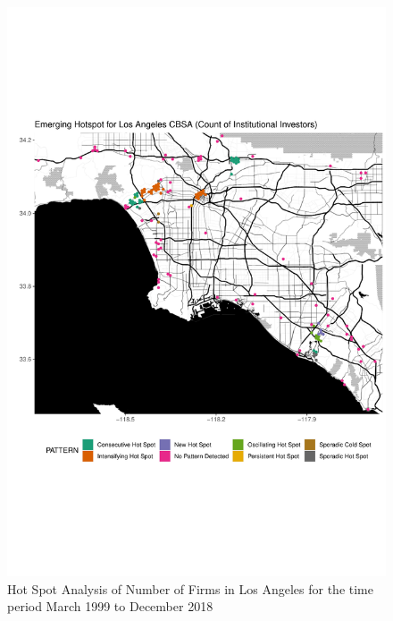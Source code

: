 \begin{figure}
	\centering
	\includegraphics[width=1\linewidth]{Figures/ChapterIV/LA_Count_EH}
	\caption[Hot Spot Analysis of Number of Firms in Los Angeles CBSA 1999-2018]{Hot Spot Analysis of Number of Firms in Los Angeles for the time period March 1999 to December 2018}
	\label{fig:LAcounthotspot}
\end{figure}

